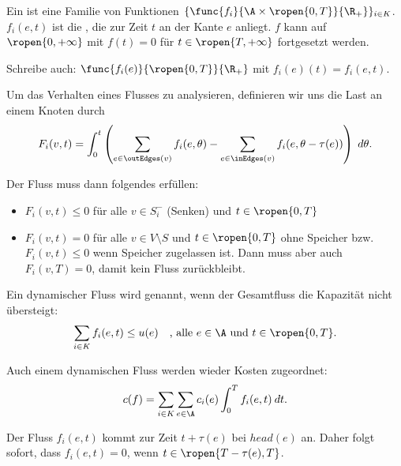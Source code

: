 \begin{definition}
    Ein  ist eine Familie von Funktionen
    $\{\func{f_i}{\A \times \ropen{0,T}}{\R_+}\}_{i \in K}$.
    $f_i(e,t)$ ist die , die zur Zeit $t$ an der Kante $e$ anliegt.
    $f$ kann auf $\ropen{0, +\infty}$ mit $f(t) = 0$ für $t \in \ropen{T, +\infty}$
    fortgesetzt werden.

    Schreibe auch: $\func{f_i(e)}{\ropen{0,T}}{\R_+}$ mit $f_i(e)(t) = f_i(e,t)$.

    Um das Verhalten eines Flusses zu analysieren, definieren wir uns die Last an
    einem Knoten durch
    \[
        F_i(v, t) =
            \int_0^t \left(
                \sum_{e \in \outEdges(v)} f_i(e, \theta) -
                \sum_{e \in \inEdges(v)} f_i(e, \theta - \tau(e)) \right) \;d\theta .
    \]

    Der Fluss muss dann folgendes erfüllen:
    \begin{itemize}
        \item $F_i(v, t) \leq 0$ für alle $v \in S_i^-$ (Senken)
            und $t \in \ropen{0,T}$
        \item $F_i(v, t) = 0$ für alle $v \in V \setminus S$ und $t \in \ropen{0,T}$
            ohne Speicher bzw. $F_i(v, t) \leq 0$ wenn Speicher zugelassen ist.
            Dann muss aber auch $F_i(v, T) = 0$, damit kein Fluss zurückbleibt.
    \end{itemize}


    Ein dynamischer Fluss wird  genannt, wenn der Gesamtfluss
    die Kapazität nicht übersteigt:
    \[
        \sum_{i \in K} f_i(e,t) \leq u(e) \quad \text{, alle } e \in \A
                                                \text{ und } t \in \ropen{0,T}.
    \]

    Auch einem dynamischen Fluss werden wieder Kosten zugeordnet:
    \[
        c(f) = \sum_{i \in K} \sum_{e \in \A} c_i(e) \int_0^T f_i(e,t) \: dt.
    \]
\end{definition}

\begin{remark}
    Der Fluss $f_i(e,t)$ kommt zur Zeit $t + \tau(e)$ bei $head(e)$ an. Daher folgt
    sofort, dass $f_i(e,t) = 0$, wenn $t \in \ropen{T - \tau(e), T}$.
\end{remark}

